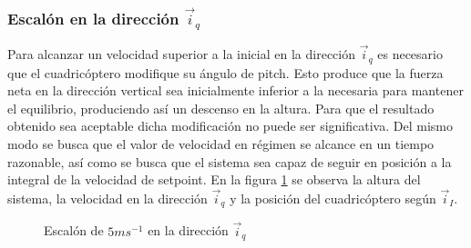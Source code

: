 \documentclass[main]{subfiles}
\begin{document}
\subsubsection*{Escal\'on en la direcci\'on $\vec{i}_q$}
Para alcanzar un velocidad superior a la inicial en la direcci\'on $\vec{i}_q$ es necesario que el cuadric\'optero modifique su \'angulo de pitch. Esto produce que la fuerza neta en la direcci\'on vertical sea inicialmente inferior a la necesaria para mantener el equilibrio, produciendo as\'i un descenso en la altura. Para que el resultado obtenido sea aceptable dicha modificaci\'on no puede ser significativa. Del mismo modo se busca que el valor de velocidad en r\'egimen se alcance en un tiempo razonable, as\'i como se busca que el sistema sea capaz de seguir en posici\'on a la integral de la velocidad de setpoint. En la figura \ref{fig:rec_esc_x} se observa la altura del sistema, la velocidad en la direcci\'on $\vec{i}_q$ y la posici\'on del cuadric\'optero seg\'un $\vec{i}_I$. 

\begin{figure}[h!]
  \centering
 
  \caption{Escal\'on de $5m s^{-1}$ en la direcci\'on $\vec{i}_q$}
  \label{fig:rec_esc_x}
\end{figure}
\end{document}
